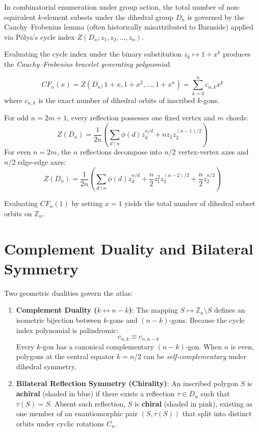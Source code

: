 In combinatorial enumeration under group action, the total number of
non-equivalent $k$-element subsets under the dihedral group $D_n$ is
governed by the Cauchy--Frobenius lemma (often historically misattributed
to Burnside) applied via P\'olya's cycle index $Z(D_n; z_1, z_2, \dots, z_n)$.

Evaluating the cycle index under the binary substitution $z_k \mapsto
1 + x^k$ produces the \emph{Cauchy--Frobenius bracelet generating polynomial}:

\begin{equation}
CF_n(x) = Z\left(D_n; 1 + x, 1 + x^2, \dots, 1 + x^n\right) = \sum_{k=0}^n c_{n,k} x^k
\end{equation}
where $c_{n,k}$ is the exact number of dihedral orbits of inscribed $k$-gons.

For odd $n = 2m + 1$, every reflection possesses one fixed vertex and $m$ chords:
\begin{equation}
Z(D_n) = \frac{1}{2n} \left( \sum_{d \mid n} \phi(d) z_d^{n/d} + n z_1 z_2^{(n-1)/2} \right)
\end{equation}
For even $n = 2m$, the $n$ reflections decompose into $n/2$ vertex-vertex axes and $n/2$ edge-edge axes:
\begin{equation}
Z(D_n) = \frac{1}{2n} \left( \sum_{d \mid n} \phi(d) z_d^{n/d} + \frac{n}{2} z_1^2 z_2^{(n-2)/2} + \frac{n}{2} z_2^{n/2} \right)
\end{equation}

Evaluating $CF_n(1)$ by setting $x = 1$ yields the total number of dihedral subset orbits on $\mathbb{Z}_n$.

\section{Complement Duality and Bilateral Symmetry}

Two geometric dualities govern the atlas:

\begin{enumerate}
    \item \textbf{Complement Duality ($k \longleftrightarrow n - k$)}:
    The mapping $S \mapsto \mathbb{Z}_n \setminus S$ defines an isometric bijection between $k$-gons and $(n-k)$-gons. Because the cycle index polynomial is palindromic:
    \begin{equation}
    c_{n,k} \equiv c_{n, n-k}
    \end{equation}
    Every $k$-gon has a canonical complementary $(n-k)$-gon. When $n$ is even, polygons at the central equator $k = n/2$ can be \emph{self-complementary} under dihedral symmetry.
    
    \item \textbf{Bilateral Reflection Symmetry (Chirality)}:
    An inscribed polygon $S$ is \textbf{achiral} (shaded in blue) if there exists a reflection $\tau \in D_n$ such that $\tau(S) = S$. Absent such reflection, $S$ is \textbf{chiral} (shaded in pink), existing as one member of an enantiomorphic pair $(S, \tau(S))$ that split into distinct orbits under cyclic rotations $C_n$.
\end{enumerate}
